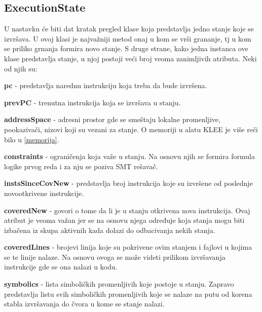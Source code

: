 \documentclass[12pt,oneside]{memoir}
\begin{document}
\subsection{ExecutionState}
U nastavku će biti dat kratak pregled klase koja predstavlja jedno stanje koje se izvršava. U ovoj klasi je najvažniji metod onaj u kom se vrši grananje, tj u kom se priliko grnanja formira novo stanje. S druge strane, kako jedna instanca ove klase predstavlja stanje, u njoj postoji veći broj veoma zanimljivih atributa. Neki od njih su:

\begin{description}
    \item \textbf{pc} - predstavlja narednu instrukciju koja treba da bude izvršena.
    
    \item \textbf{prevPC} - trenutna instrukcija koja se izvršava u stanju.
    
    \item \textbf{addressSpace} - adresni prostor gde se smeštaju lokalne promenljive, pookazivači, nizovi koji su vezani za stanje. O memoriji u alatu KLEE je više reči bilo u \ref{memorija}.
    
    \item \textbf{constraints} - ograničenja koja važe u stanju. Na osnovu njih se formira formula logike prvog reda i za nju se poziva SMT rešavač.
    
    \item \textbf{instsSinceCovNew} - predstavlja broj instrukcija koje su izvršene od poslednje novootkrivene instrukcije.
    
    \item \textbf{coveredNew} - govori o tome da li je u stanju otkrivena nova instrukcija. Ovaj atribut je veoma važan jer se na osnovu njega određuje koja stanja mogu biti izbačena iz skupa aktivnih kada dolazi do odbacivanja nekih stanja.
    
    \item \textbf{coveredLines} - brojevi linija koje su pokrivene ovim stanjem i fajlovi u kojima se te linije nalaze. Na osnovu ovoga se može videti prilikom izvršavanja instrukcije gde se ona nalazi u kodu.
    
    \item \textbf{symbolics} - lista simboličkih promenljivih koje postoje u stanju. Zapravo predstavlja listu svih simboličkih promenljivih koje se nalaze na putu od korena stabla izvršavanja do čvora u kome se stanje nalazi.
\end{description}
\end{document}
